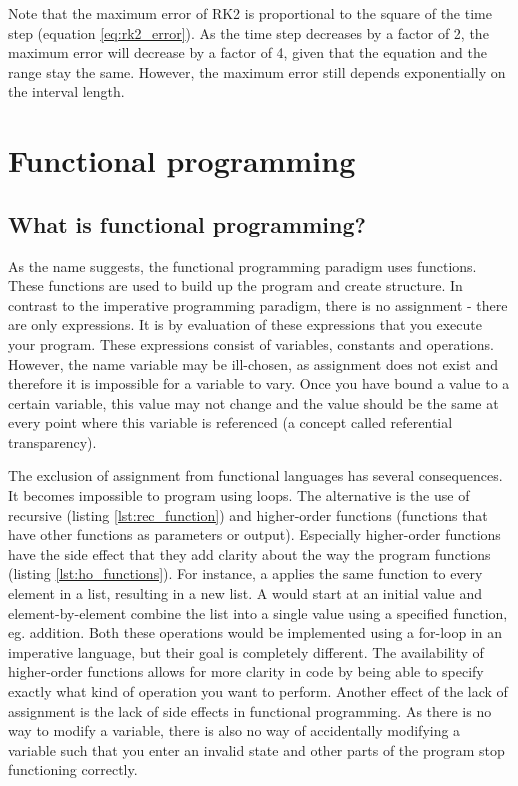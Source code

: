 Note that the maximum error of RK2 is proportional to the square of the time step (equation \ref{eq:rk2_error}). As the time step decreases by a factor of 2, the maximum error will decrease by a factor of 4, given that the equation and the range stay the same. However, the maximum error still depends exponentially on the interval length.


\section{Functional programming}
\lstset{style=haskellStyle}
\subsection{What is functional programming?}
As the name suggests, the functional programming paradigm uses functions. These functions are used to build up the program and create structure. In contrast to the imperative programming paradigm, there is no assignment - there are only expressions. It is by evaluation of these expressions that you execute your program. These expressions consist of variables, constants and operations. However, the name variable may be ill-chosen, as assignment does not exist and therefore it is impossible for a variable to vary. Once you have bound a value to a certain variable, this value may not change and the value should be the same at every point where this variable is referenced (a concept called referential transparency). 

The exclusion of assignment from functional languages has several consequences. It becomes impossible to program using loops. The alternative is the use of recursive (listing \ref{lst:rec_function}) and higher-order functions (functions that have other functions as parameters or output). Especially higher-order functions have the side effect that they add clarity about the way the program functions (listing \ref{lst:ho_functions}). For instance, a  applies the same function to every element in a list, resulting in a new list. A  would start at an initial value and element-by-element combine the list into a single value using a specified function, eg. addition. Both these operations would be implemented using a for-loop in an imperative language, but their goal is completely different. The availability of higher-order functions allows for more clarity in code by being able to specify exactly what kind of operation you want to perform. Another effect of the lack of assignment is the lack of side effects in functional programming. As there is no way to modify a variable, there is also no way of accidentally modifying a variable such that you enter an invalid state and other parts of the program stop functioning correctly.

